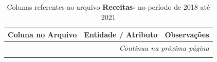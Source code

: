 \normalsize

\vspace{0.5cm}

\small
\begin{longtable}{|p{4.0cm}|p{5.0cm}|p{5.5cm}|}
\caption{Colunas referentes ao arquivo \textbf{Receitas-} no período de 2018 até 2021}
\label{tabela-mapeamento-base-grupo-Receitas--periodo-2018-2021} \\ 
    \hline
    \textbf{Coluna no Arquivo} & \textbf{Entidade / Atributo} & \textbf{Observações} \\ \hline
    \endhead

    \hline \multicolumn{3}{r}{\textit{Continua na próxima página}} \\ \hline
    \endfoot

    \hline
    \endlastfoot


\end{longtable}
